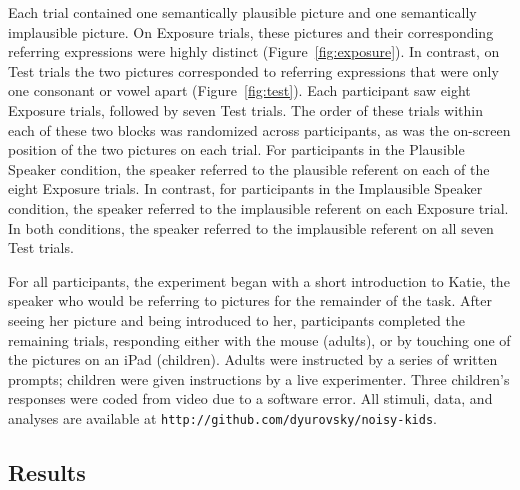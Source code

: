\documentclass[man,floatsintext]{apa6}
\begin{document}
Each trial contained one semantically plausible picture and one semantically implausible picture. On Exposure trials, these pictures and their corresponding referring expressions were highly distinct (Figure~\ref{fig:exposure}). In contrast, on Test trials the two pictures corresponded to referring expressions that were only one consonant or vowel apart (Figure~\ref{fig:test}). Each participant saw eight Exposure trials, followed by seven Test trials. The order of these trials within each of these two blocks was randomized across participants, as was the on-screen position of the two pictures on each trial. For participants in the Plausible Speaker condition, the speaker referred to the plausible referent on each of the eight Exposure trials. In contrast, for participants in the Implausible Speaker condition, the speaker referred to the implausible referent on each Exposure trial. In both conditions, the speaker referred to the implausible referent on all seven Test trials.

For all participants, the experiment began with a short introduction to Katie, the speaker who would be referring to pictures for the remainder of the task. After seeing her picture and being introduced to her, participants completed the remaining trials, responding either with the mouse (adults), or by touching one of the pictures on an iPad (children). Adults were instructed by a series of written prompts; children were given instructions by a live experimenter. Three children's responses were coded from video due to a software error. All stimuli, data, and analyses are available at {\small \tt{http://github.com/dyurovsky/noisy-kids}}.

\subsection{Results}
\end{document}
